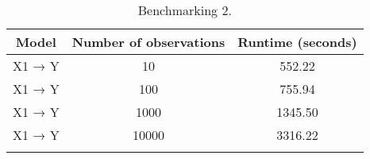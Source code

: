 \documentclass[
  11pt,
  article]{jss}
\begin{document}
\begin{longtable}{ccc}

\toprule
Model & Number of observations & Runtime (seconds)\\
\midrule
X1 → Y & 10 & 552.22\\
X1 → Y & 100 & 755.94\\
X1 → Y & 1000 & 1345.50\\
X1 → Y & 10000 & 3316.22\\
\bottomrule


\caption{\label{tbl-bench2}Benchmarking 2.}

\tabularnewline
\end{longtable}

\newpage{}
\end{document}
